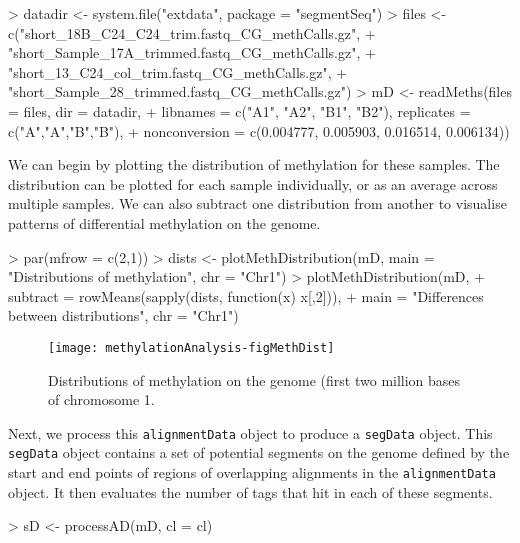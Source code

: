 \documentclass[a4paper]{article}
\begin{document}
\begin{Schunk}
\begin{Sinput}
> datadir <- system.file("extdata", package = "segmentSeq")
> files <- c("short_18B_C24_C24_trim.fastq_CG_methCalls.gz",
+ "short_Sample_17A_trimmed.fastq_CG_methCalls.gz",
+ "short_13_C24_col_trim.fastq_CG_methCalls.gz",
+ "short_Sample_28_trimmed.fastq_CG_methCalls.gz")
> mD <- readMeths(files = files, dir = datadir,
+ libnames = c("A1", "A2", "B1", "B2"), replicates = c("A","A","B","B"),
+ nonconversion = c(0.004777, 0.005903, 0.016514, 0.006134))
\end{Sinput}
\end{Schunk}

We can begin by plotting the distribution of methylation for these samples. The distribution can be plotted for each sample individually, or as an average across multiple samples. We can also subtract one distribution from another to visualise patterns of differential methylation on the genome.

\begin{Schunk}
\begin{Sinput}
> par(mfrow = c(2,1))
> dists <- plotMethDistribution(mD, main = "Distributions of methylation", chr = "Chr1")
> plotMethDistribution(mD, 
+                      subtract = rowMeans(sapply(dists, function(x) x[,2])), 
+                      main = "Differences between distributions", chr = "Chr1")
\end{Sinput}
\end{Schunk}

\begin{figure}[!ht]
\begin{center}
\texttt{[image: methylationAnalysis-figMethDist]}
\caption{Distributions of methylation on the genome (first two million bases of chromosome 1.}
\label{fig:Seg}
\end{center}
\end{figure}


Next, we process this \verb'alignmentData' object to produce a \verb'segData' object. This \verb'segData' object contains a set of potential segments on the genome defined by the start and end points of regions of overlapping alignments in the \verb'alignmentData' object. It then evaluates the number of tags that hit in each of these segments.

\begin{Schunk}
\begin{Sinput}
> sD <- processAD(mD, cl = cl)
\end{Sinput}
\end{Schunk}
\end{document}
